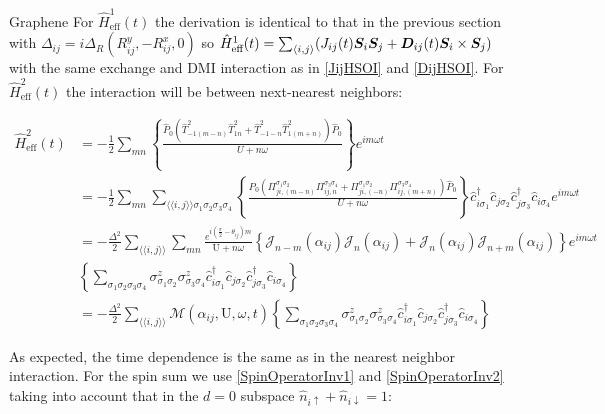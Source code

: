 \begin{section}{Graphene}
For $\hat{H}_{\text{eff}}^1(t)$ the derivation is identical to that in the previous section with $\Delta_{ij} = i\Delta_R (R_{ij}^y, - R_{ij}^x, 0)$ so $\hat{H}_{\text{eff}}^1(t) = \sum_{\langle i,j \rangle} (J_{ij}(t) \boldsymbol{S}_i\boldsymbol{S}_j + \boldsymbol{D}_{ij}(t)\boldsymbol{S}_i \times \boldsymbol{S}_j)$ with the same exchange and DMI interaction as in \ref{JijHSOI} and \ref{DijHSOI}. For $\hat{H}_{\text{eff}}^2(t)$ the interaction will be between next-nearest neighbors:

\begin{align*}
\hat{H}_{\text{eff}}^2(t) &= -\frac{1}{2}\sum_{mn} \left\{ \frac{\hat{P}_0  (\hat{T}_{-1(m-n)}^2\hat{T}_{1n}^2 + \hat{T}_{-1-n}^2\hat{T}_{1(m+n)}^2)\hat{P}_0}{U+n\omega} \right\} e^{im\omega t} \\
&= -\frac{1}{2}\sum_{mn} \sum_{\langle \langle i,j \rangle \rangle \sigma_1 \sigma_2 \sigma_3 \sigma_4} \left\{ \frac{\hat{P}_0 (\Pi_{ji,(m-n)}^{\sigma_1\sigma_2}\Pi_{ij,n}^{\sigma_3\sigma_4} + \Pi_{ji,(-n)}^{\sigma_1\sigma_2}\Pi_{ij,(m+n)}^{\sigma_3\sigma_4}) \hat{P}_0}{U+n\omega} \right\}\hat{c}_{i\sigma_1}^\dagger\hat{c}_{j\sigma_2}\hat{c}_{j\sigma_3}^\dagger\hat{c}_{i\sigma_4} e^{im\omega t} \\
&= -\frac{\Delta^2}{2} \sum_{\langle \langle i,j \rangle \rangle} \sum_{mn} \frac{e^{i(\frac{\pi}{2}-\theta_{ij})m}}{\text{U}+n\omega} \left\{ \mathcal{J}_{n-m}(\alpha_{ij})\mathcal{J}_{n}(\alpha_{ij})+\mathcal{J}_{n}(\alpha_{ij})\mathcal{J}_{n+m}(\alpha_{ij}) \right\} e^{im \omega t} \\
& \left\{ \sum_{\sigma_1 \sigma_2 \sigma_3 \sigma_4} \sigma_{\sigma_1 \sigma_2}^z\sigma_{\sigma_3 \sigma_4}^z \hat{c}_{i\sigma_1}^\dagger\hat{c}_{j\sigma_2}\hat{c}_{j\sigma_3}^\dagger\hat{c}_{i\sigma_4} \right\} \\
&= -\frac{\Delta^2}{2} \sum_{\langle \langle i,j \rangle \rangle} \mathcal{M}(\alpha_{ij}, \text{U}, \omega, t) \left\{ \sum_{\sigma_1 \sigma_2 \sigma_3 \sigma_4} \sigma_{\sigma_1 \sigma_2}^z\sigma_{\sigma_3 \sigma_4}^z \hat{c}_{i\sigma_1}^\dagger\hat{c}_{j\sigma_2}\hat{c}_{j\sigma_3}^\dagger\hat{c}_{i\sigma_4} \right\}
\end{align*}

As expected, the time dependence is the same as in the nearest neighbor interaction. For the spin sum we use \ref{SpinOperatorInv1} and \ref{SpinOperatorInv2} taking into account that in the $d=0$ subspace $\hat{n}_{i\uparrow}+\hat{n}_{i\downarrow} = 1$:


\end{section}
